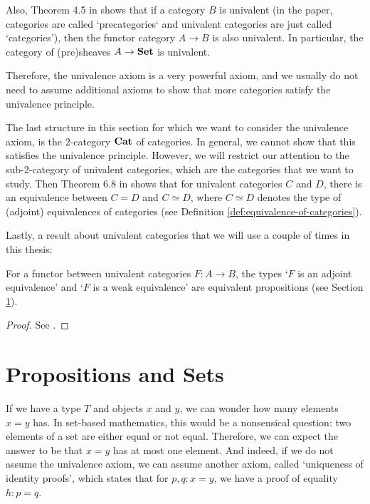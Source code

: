 Also, Theorem 4.5 in \autocite{univalent-categories} shows that if a category $ B $ is univalent (in the paper, categories are called `precategories` and univalent categories are just called `categories'), then the functor category $ A \rightarrow B $ is also univalent. In particular, the category of (pre)sheaves $ A \to \mathbf{Set} $ is univalent.

Therefore, the univalence axiom is a very powerful axiom, and we usually do not need to assume additional axioms to show that more categories satisfy the univalence principle.

The last structure in this section for which we want to consider the univalence axiom, is the 2-category $ \mathbf{Cat} $ of categories. In general, we cannot show that this satisfies the univalence principle. However, we will restrict our attention to the sub-2-category of univalent categories, which are the categories that we want to study. Then Theorem 6.8 in \autocite{univalent-categories} shows that for univalent categories $ C $ and $ D $, there is an equivalence between $ C = D $ and $ C \simeq D $, where $ C \simeq D $ denotes the type of (adjoint) equivalences of categories (see Definition \ref{def:equivalence-of-categories}).

Lastly, a result about univalent categories that we will use a couple of times in this thesis:
\begin{lemma}\label{lem:univalen-category-equivalence}
  For a functor between univalent categories $ F: A \to B $, the types `$ F $ is an adjoint equivalence' and `$ F $ is a weak equivalence' are equivalent propositions (see Section \ref{sec:homotopy-props-sets}).
\end{lemma}
\begin{proof}
  See \autocite[][Lemma 6.8]{univalent-categories}.
\end{proof}

\section{Propositions and Sets}\label{sec:homotopy-props-sets}
If we have a type $ T $ and objects $ x $ and $ y $, we can wonder how many elements $ x = y $ has. In set-based mathematics, this would be a nonsensical question: two elements of a set are either equal or not equal. Therefore, we can expect the answer to be that $ x = y $ has at most one element. And indeed, if we do not assume the univalence axiom, we can assume another axiom, called `uniqueness of identity proofs', which states that for $ p, q: x = y $, we have a proof of equality $ h: p = q $.

